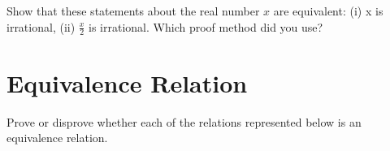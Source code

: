 \documentclass[addpoints]{exam}
\begin{document}
\begin{questions}

\question[5]
  Show that these statements about the real number $x$ are equivalent: (i) x is irrational, (ii)  $\frac{x}{2}$ is irrational. Which proof method did you use?

  \begin{solution}
  \end{solution}
  
  \section{Equivalence Relation}
  
\question Prove or disprove whether each of the relations represented below is an equivalence relation.
\end{questions}
\end{document}
